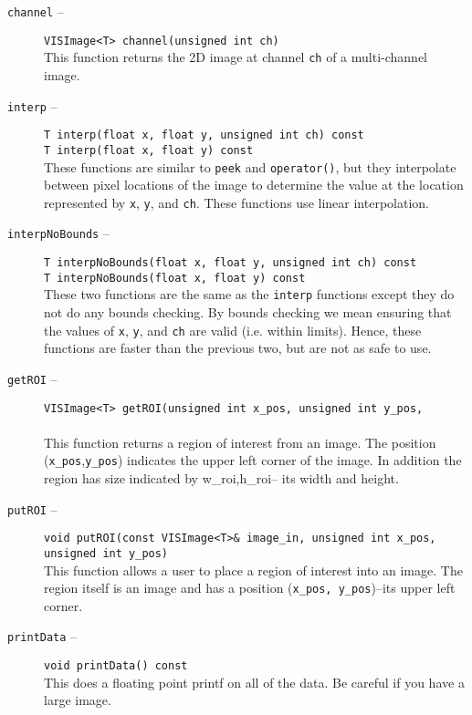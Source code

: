 \begin{description}
\item[{\tt channel} --]
{\tt VISImage<T> channel(unsigned int ch)}\\
This function returns the 2D image at channel {\tt ch}
of a multi-channel image.
\item[{\tt interp} --]
{\tt T interp(float x, float y, unsigned int ch) const}\\
{\tt T interp(float x, float y) const}\\
These functions are similar to {\tt peek} and {\tt operator()}, but
they interpolate between pixel locations of the image to determine the value
at the location represented by {\tt x}, {\tt y}, and {\tt ch}.
These functions use linear interpolation.
\item[{\tt interpNoBounds} --]
{\tt T interpNoBounds(float x, float y, unsigned int ch) const}\\
{\tt T interpNoBounds(float x, float y) const}\\
These two functions are the same as the {\tt interp} functions
except they do not do any bounds checking.
By bounds checking we mean ensuring that the values of {\tt x},
{\tt y}, and {\tt ch} are
valid (i.e. within limits).
Hence, these functions are faster than the previous two,
but are not as safe to use.
\item[{\tt getROI} --]
{\tt VISImage<T> getROI(unsigned int x\_pos, unsigned int y\_pos,}\\
\hspace*{0.25in}{\tt unsigned int w\_roi, unsigned int h\_roi)}\\
This function returns a region of interest from an image.
The position ({\tt x\_pos},{\tt y\_pos}) indicates the upper left corner
of the image.
In addition the region has size indicated by w\_roi,h\_roi--
its width and height.
\item[{\tt putROI} --]
{\tt void putROI(const VISImage<T>\& image\_in, unsigned int x\_pos, unsigned int y\_pos)}\\
This function allows a user to place a region of interest into an image.
The region itself is an image and has a position ({\tt x\_pos, y\_pos})--its
upper left corner.
\item[{\tt printData} --]
{\tt void printData() const}\\
This does a floating point printf on all of the data.  Be careful if you have a large
image.
\end{description}

